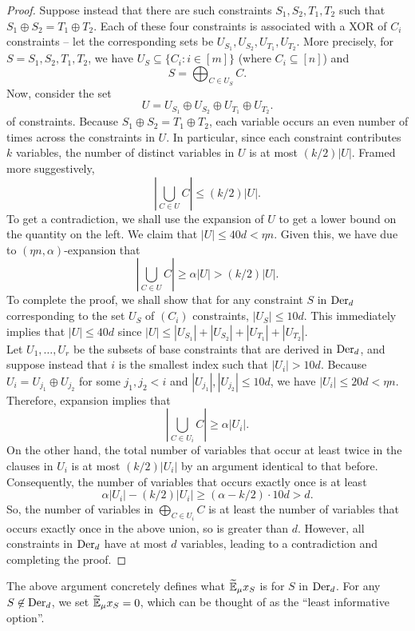 	\begin{proof}
		Suppose instead that there are such constraints $S_1,S_2,T_1,T_2$ such that $S_1 \oplus S_2 = T_1 \oplus T_2$. Each of these four constraints is associated with a XOR of $C_i$ constraints -- let the corresponding sets be $U_{S_1},U_{S_2},U_{T_1},U_{T_2}$. More precisely, for $S = S_1,S_2,T_1,T_2$, we have $U_S \subseteq \{C_i : i \in [m]\}$ (where $C_i \subseteq [n]$) and
		\[ S = \bigoplus_{C \in U_{S}} C. \]
		Now, consider the set
		\[ U = U_{S_1} \oplus U_{S_2} \oplus U_{T_1} \oplus U_{T_2}. \]
		of constraints. Because $S_1 \oplus S_2 = T_1 \oplus T_2$, each variable occurs an even number of times across the constraints in $U$. In particular, since each constraint contributes $k$ variables, the number of distinct variables in $U$ is at most $(k/2) |U|$. Framed more suggestively,
		\[ \left| \bigcup_{C \in U} C \right| \le (k/2) |U|. \]
		To get a contradiction, we shall use the expansion of $U$ to get a lower bound on the quantity on the left. We claim that $|U| \le 40d < \eta n$. Given this, we have due to $(\eta n, \alpha)$-expansion that
		\[ \left| \bigcup_{C \in U} C \right| \ge \alpha |U| > (k/2) |U|. \]
		To complete the proof, we shall show that for any constraint $S$ in $\operatorname{Der}_d$ corresponding to the set $U_S$ of $(C_i)$ constraints, $|U_S| \le 10d$. This immediately implies that $|U| \le 40d$ since $|U| \le |U_{S_1}| + |U_{S_2}| + |U_{T_1}| + |U_{T_2}|$.\\
		Let $U_1,\ldots,U_r$ be the subsets of base constraints that are derived in $\operatorname{Der}_d$, and suppose instead that $i$ is the smallest index such that $|U_i| > 10d$. Because $U_i = U_{j_1} \oplus U_{j_2}$ for some $j_1,j_2 < i$ and $|U_{j_1}|,|U_{j_2}| \le 10d$, we have $|U_i| \le 20d < \eta n$. Therefore, expansion implies that
		\[ \left| \bigcup_{C \in U_i} C \right| \ge \alpha |U_i|. \]
		On the other hand, the total number of variables that occur at least twice in the clauses in $U_i$ is at most $(k/2) |U_i|$ by an argument identical to that before. Consequently, the number of variables that occurs exactly once is at least
		\[ \alpha |U_i| - (k/2) |U_i| \ge (\alpha - k/2) \cdot 10d > d. \]
		So, the number of variables in $\bigoplus_{C \in U_i} C$ is at least the number of variables that occurs exactly once in the above union, so is greater than $d$. However, all constraints in $\operatorname{Der}_d$ have at most $d$ variables, leading to a contradiction and completing the proof.
	\end{proof}

	The above argument concretely defines what $\widetilde{\mathbb{E}}_\mu x_S$ is for $S$ in $\operatorname{Der}_d$. For any $S \not\in \operatorname{Der}_d$, we set $\widetilde{\mathbb{E}}_\mu x_S = 0$, which can be thought of as the ``least informative option''.\\

